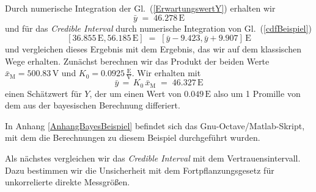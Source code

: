 Durch numerische Integration der Gl.~(\ref{ErwartungswertY}) erhalten wir
$$
\bar y \; = \; 46.278 \, \mathrm{E}
$$
und für das \textsl{Credible Interval} durch numerische Integration von Gl.~(\ref{cdfBeispiel})
$$
[36.855 \, \mathrm{E}, 56.185 \, \mathrm{E}] \; = \; [\bar y - 9.423, \bar y + 9.907] \, \mathrm{E}
$$
und vergleichen dieses Ergebnis mit dem Ergebnis, das wir auf dem klassischen Wege erhalten. Zunächst
berechnen wir das Produkt der beiden Werte $\bar x_\mathrm{M} = 500.83 \, \mathrm{V}$ und
$K_0 = 0.0925 \, \frac{\mathrm{E}}{\mathrm{V}}$. Wir erhalten mit
$$
\bar y \, = \, K_0 \, \bar x_\mathrm{M} \; = \; 46.327 \, \mathrm{E}
$$
einen Schätzwert für $Y$, der um einen Wert von $0.049 \, \mathrm{E}$ also um 1 Promille von dem aus der
bayesischen Berechnung differiert.

In Anhang \ref{AnhangBayesBeispiel} befindet sich das Gnu-Octave/Matlab-Skript, mit dem die Berechnungen zu diesem
Beispiel durchgeführt wurden.

Als nächstes vergleichen wir das \textsl{Credible Interval} mit dem
Vertrauensintervall. Dazu bestimmen wir die Unsicherheit mit
dem Fortpflanzungsgesetz für unkorrelierte direkte Messgrößen.

